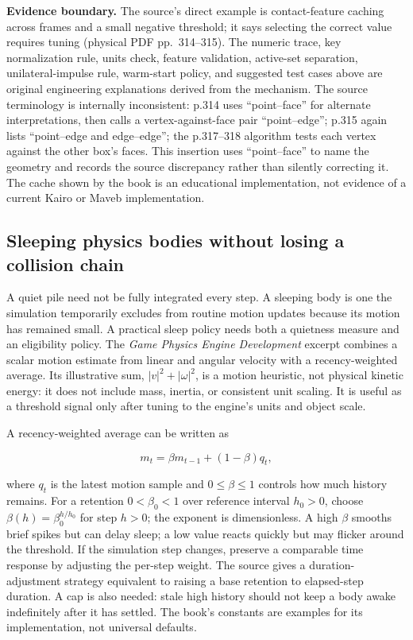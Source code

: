 \textbf{Evidence boundary.} The source's direct example is contact-feature caching across frames and a small negative threshold; it says selecting the correct value requires tuning (physical PDF pp.~314--315). The numeric trace, key normalization rule, units check, feature validation, active-set separation, unilateral-impulse rule, warm-start policy, and suggested test cases above are original engineering explanations derived from the mechanism. The source terminology is internally inconsistent: p.314 uses ``point--face'' for alternate interpretations, then calls a vertex-against-face pair ``point--edge''; p.315 again lists ``point--edge and edge--edge''; the p.317--318 algorithm tests each vertex against the other box's faces. This insertion uses ``point--face'' to name the geometry and records the source discrepancy rather than silently correcting it. The cache shown by the book is an educational implementation, not evidence of a current Kairo or Maveb implementation.

\subsection{Sleeping physics bodies without losing a collision chain}\label{06-engine-ii-ch033-sleeping-physics-bodies-without-losing-a-collision-chain}

\hypertarget{06-engine-ii-ch033-sleeping-physics-bodies-without-losing-a-collision-chain}{}

A quiet pile need not be fully integrated every step. A sleeping body is one the simulation temporarily excludes from routine motion updates because its motion has remained small. A practical sleep policy needs both a quietness measure and an eligibility policy. The \emph{Game Physics Engine Development} excerpt combines a scalar motion estimate from linear and angular velocity with a recency-weighted average. Its illustrative sum, \(|v|^2 + |\omega|^2\), is a motion heuristic, not physical kinetic energy: it does not include mass, inertia, or consistent unit scaling. It is useful as a threshold signal only after tuning to the engine's units and object scale.

A recency-weighted average can be written as

\[m_t = \beta m_{t-1} + (1-\beta)q_t,\]

where \(q_t\) is the latest motion sample and \(0\leq\beta\leq1\) controls how much history remains. For a retention \(0<\beta_0<1\) over reference interval \(h_0>0\), choose \(\beta(h)=\beta_0^{h/h_0}\) for step \(h>0\); the exponent is dimensionless. A high \(\beta\) smooths brief spikes but can delay sleep; a low value reacts quickly but may flicker around the threshold. If the simulation step changes, preserve a comparable time response by adjusting the per-step weight. The source gives a duration-adjustment strategy equivalent to raising a base retention to elapsed-step duration. A cap is also needed: stale high history should not keep a body awake indefinitely after it has settled. The book's constants are examples for its implementation, not universal defaults.

